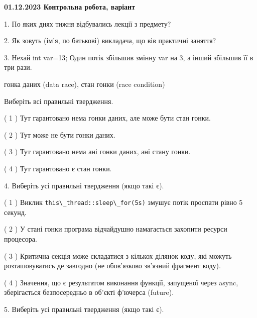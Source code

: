 \documentclass[12pt, ukrainian]{article}
\def\code#1{\Verb!#1!}
\begin{document}
\vspace{4mm}
\newpage
\begin {large}

\textbf{01.12.2023 Контрольна робота, варіант  }\par


{
1. По яких днях тижня відбувались лекції з предмету?



\vspace{5mm}
2. Як зовуть (ім'я, по батькові) викладача, що вів практичні заняття?



\vspace{5mm}
3. Нехай int var=13; Один потік збільшив змінну var на 3, а інший збільшив її в три рази.

гонка даних (data race), стан гонки (race condition)

Виберіть всі правильні твердження.\par
\vspace{2mm}
( 1 ) Тут гарантовано нема гонки даних, але може бути стан гонки.%

( 2 ) Тут може не бути гонки даних.%

( 3 ) Тут гарантовано нема ані гонки даних, ані стану гонки.%

( 4 ) Тут гарантовано є стан гонки.%


\vspace{5mm}
4. Виберіть усі правильні твердження (якщо такі є).\par
\vspace{2mm}

( 1 ) Виклик \code{this\_thread::sleep\_for(5s)} змушує потік проспати рівно 5 секунд.%

( 2 ) У стані гонки програма відчайдушно намагається захопити ресурси процесора.%

( 3 ) Критична секція може складатися з кількох ділянок коду, які можуть розташовуватись де завгодно (не обов’язково зв’язний фрагмент коду).%

( 4 ) Значення, що є результатом виконання функції, запущеної через async, зберігається безпосередньо в об’єкті ф’ючерса (future).%


\vspace{5mm}
5. Виберіть усі правильні твердження (якщо такі є).\par
\vspace{2mm}

}
\end{large}
\end{document}

